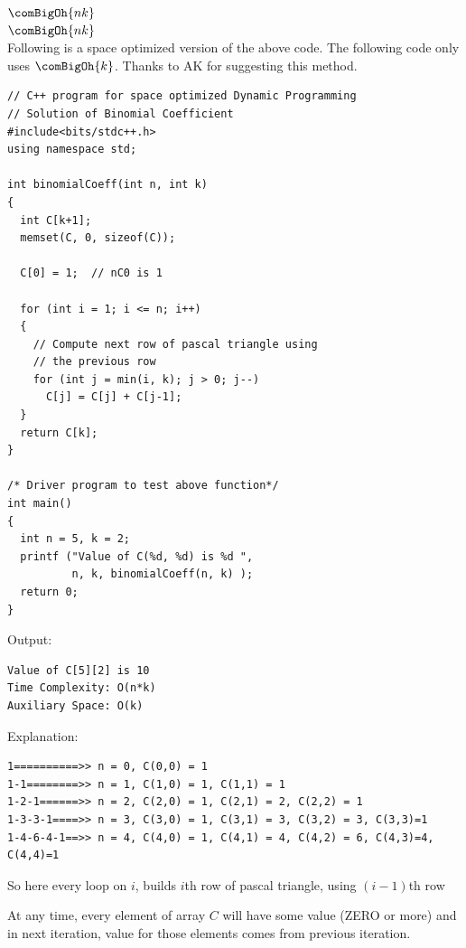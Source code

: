 \noindent{} $\comBigOh{nk}$\\
 $\comBigOh{nk}$\\

Following is a space optimized version of the above code. The following code
only uses $\comBigOh{k}$. Thanks to AK for suggesting this method.
\begin{lstlisting}[style=raycppnewsnippet]
// C++ program for space optimized Dynamic Programming
// Solution of Binomial Coefficient
#include<bits/stdc++.h>
using namespace std;
 
int binomialCoeff(int n, int k)
{
  int C[k+1];
  memset(C, 0, sizeof(C));

  C[0] = 1;  // nC0 is 1

  for (int i = 1; i <= n; i++)
  {
    // Compute next row of pascal triangle using
    // the previous row
    for (int j = min(i, k); j > 0; j--)
      C[j] = C[j] + C[j-1];
  }
  return C[k];
}
 
/* Driver program to test above function*/
int main()
{
  int n = 5, k = 2;
  printf ("Value of C(%d, %d) is %d ",
          n, k, binomialCoeff(n, k) );
  return 0;
}
\end{lstlisting}
Output:
\begin{lstlisting}[style=rayio]
Value of C[5][2] is 10
Time Complexity: O(n*k)
Auxiliary Space: O(k)
\end{lstlisting}
Explanation:
\begin{lstlisting}[style=raygeneric]
1==========>> n = 0, C(0,0) = 1
1-1========>> n = 1, C(1,0) = 1, C(1,1) = 1
1-2-1======>> n = 2, C(2,0) = 1, C(2,1) = 2, C(2,2) = 1
1-3-3-1====>> n = 3, C(3,0) = 1, C(3,1) = 3, C(3,2) = 3, C(3,3)=1
1-4-6-4-1==>> n = 4, C(4,0) = 1, C(4,1) = 4, C(4,2) = 6, C(4,3)=4, C(4,4)=1
\end{lstlisting}
So here every loop on $i$, builds $i$th row of pascal triangle, using
$(i-1)$th row

At any time, every element of array $C$ will have some value (ZERO or more)
and in next iteration, value for those elements comes from previous
iteration.

